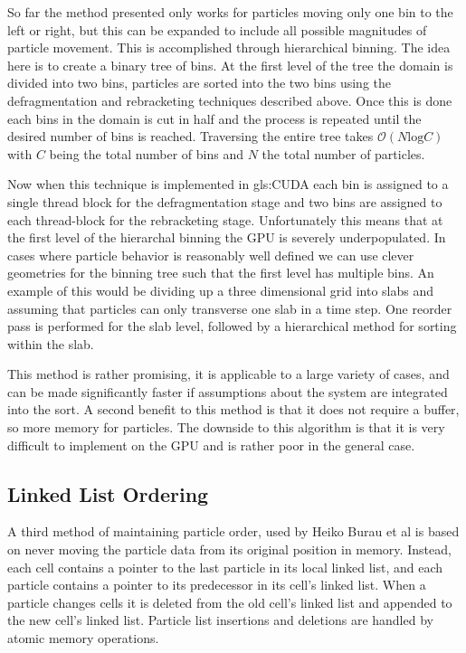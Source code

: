 	So far the method presented only works for particles moving only one bin to the left or right, but this can be expanded to include all possible magnitudes of particle movement. This is accomplished through hierarchical binning. The idea here is to create a binary tree of bins. At the first level of the tree the domain is divided into two bins, particles are sorted into the two bins using the defragmentation and rebracketing techniques described above. Once this is done each bins in the domain is cut in half and the process is repeated until the desired number of bins is reached. Traversing the entire tree takes $\mathcal{O}(N \mathrm{log} C)$ with $C$ being the total number of bins and $N$ the total number of particles. \cite{Stantchev2008}

Now when this technique is implemented in \gls{gls:CUDA} each bin is assigned to a single thread block for the defragmentation stage and two bins are assigned to each thread-block for the rebracketing stage.  Unfortunately this means that at the first level of the hierarchal binning the GPU is severely underpopulated. In cases where particle behavior is reasonably well defined we can use clever geometries for the binning tree such that the first level has multiple bins. An example of this would be dividing up a three dimensional grid into slabs and assuming that particles can only transverse one slab in a time step. One reorder pass is performed for the slab level, followed by a hierarchical method for sorting within the slab. 

This method is rather promising, it is applicable to a large variety of cases, and can be made significantly faster if assumptions about the system are integrated into the sort. A second benefit to this method is that it does not require a buffer, so more memory for particles. The downside to this algorithm is that it is very difficult to implement on the GPU and is rather poor in the general case. 


	\subsection{Linked List Ordering}
	A third method of maintaining particle order, used by Heiko Burau et al is based on never moving the particle data from its original position in memory. Instead, each cell contains a pointer to the last particle in its local linked list, and each particle contains a pointer to its predecessor in its cell's linked list. When a particle changes cells it is deleted from the old cell's linked list and appended to the new cell's linked list. Particle list insertions and deletions are handled by atomic memory operations. \cite{Burau2010}

